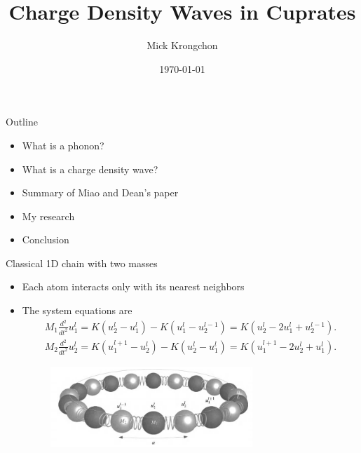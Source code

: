 \documentclass{beamer}
\title[]{Charge Density Waves in Cuprates}
\author{Mick Krongchon}
\institute{University of Illinois at Urbana-Champaign}
\date{\today}
\begin{document}
\begin{frame}
\titlepage
\end{frame}

\begin{frame}{Outline}
\begin{itemize}
\item What is a phonon?
\item What is a charge density wave?
\item Summary of Miao and Dean's paper
\item My research
\item Conclusion
\end{itemize}
\end{frame}

\begin{frame}{Classical 1D chain with two masses}
\begin{itemize}
\item Each atom interacts only with its nearest neighbors
\item The system equations are
\begin{align*}
M_1 \frac{d^2}{dt^2} u_1^l = K(u_2^l - u_1^l) - K(u_1^l - u_2^{l - 1}) = K(u_2^l - 2u_1^l + u_2^{l - 1}). \\
M_2 \frac{d^2}{dt^2} u_2^l = K(u_1^{l + 1} - u_2^l) - K(u_2^l - u_1^l) = K(u_1^{l + 1} - 2u_2^l + u_1^l).
\end{align*}
\begin{figure}
\includegraphics[width=3in]{figs/1d_diagram.png}
\caption{\label{fig:1d_diagram}} %
\end{figure}
\end{itemize}
\end{frame}
\end{document}

